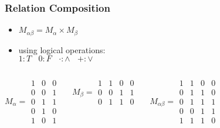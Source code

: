 \documentclass[dvipsnames]{beamer}
\begin{document}
\begin{frame}
  \frametitle{Relation Composition}

  \begin{itemize}
    \item $M_{\alpha \beta} = M_{\alpha} \times M_{\beta}$
    \item using logical operations:\\
      $1:T~~~~0:F~~~~\cdot:\wedge~~~~+:\vee$
  \end{itemize}

  \pause
  \begin{example}
    \begin{columns}
      \[
        M_\alpha =
          \begin{array}{|ccc|}
            1 & 0 & 0\\
            0 & 0 & 1\\
            0 & 1 & 1\\
            0 & 1 & 0\\
            1 & 0 & 1
         \end{array}
      \]

      \[
        M_\beta =
          \begin{array}{|cccc|}
            1 & 1 & 0 & 0\\
            0 & 0 & 1 & 1\\
            0 & 1 & 1 & 0
          \end{array}
      \]

      \[
        M_{\alpha \beta} =
          \begin{array}{|cccc|}
            1 & 1 & 0 & 0\\
            0 & 1 & 1 & 0\\
            0 & 1 & 1 & 1\\
            0 & 0 & 1 & 1\\
            1 & 1 & 1 & 0
          \end{array}
      \]
    \end{columns}
  \end{example}
\end{frame}
\end{document}
